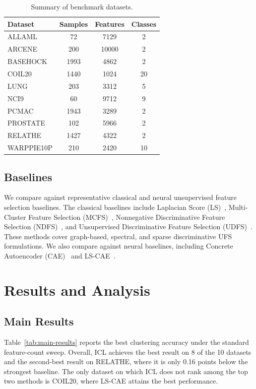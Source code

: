 \documentclass[sigconf,natbib=true,anonymous=true]{acmart}
\begin{document}
\begin{table}[h]
  \caption{Summary of benchmark datasets.}
  \label{tab:datasets}
  \centering
  \begin{tabular}{lccc}
    \toprule
    Dataset & Samples & Features & Classes \\
    \midrule
    ALLAML     & 72   & 7129  & 2  \\
    ARCENE     & 200  & 10000 & 2  \\
    BASEHOCK   & 1993 & 4862  & 2  \\
    COIL20     & 1440 & 1024  & 20 \\
    LUNG       & 203  & 3312  & 5  \\
    NCI9       & 60   & 9712  & 9  \\
    PCMAC      & 1943 & 3289  & 2  \\
    PROSTATE   & 102  & 5966  & 2  \\
    RELATHE    & 1427 & 4322  & 2  \\
    WARPPIE10P & 210  & 2420  & 10 \\
    \bottomrule
  \end{tabular}
\end{table}



\subsection{Baselines}
We compare against representative classical and neural unsupervised feature
selection baselines. The classical baselines include Laplacian Score (LS)~\cite{he2005laplacian},
Multi-Cluster Feature Selection (MCFS)~\cite{cai2010unsupervised},
Nonnegative Discriminative Feature Selection (NDFS)~\cite{li2012unsupervised},
and Unsupervised Discriminative Feature Selection (UDFS)~\cite{yang2011udfs}.
These methods cover graph-based, spectral, and sparse discriminative UFS
formulations. We also compare against neural baselines, including Concrete
Autoencoder (CAE)~\cite{balin2019concrete} and LS-CAE~\cite{shaham2022deep}.

\section{Results and Analysis}
\subsection{Main Results}
Table~\ref{tab:main-results} reports the best clustering accuracy under the
standard feature-count sweep. Overall, ICL achieves the best result on 8 of the
10 datasets and the second-best result on RELATHE, where it is only 0.16 points
below the strongest baseline. The only dataset on which ICL does not rank among
the top two methods is COIL20, where LS-CAE attains the best performance.
\end{document}
